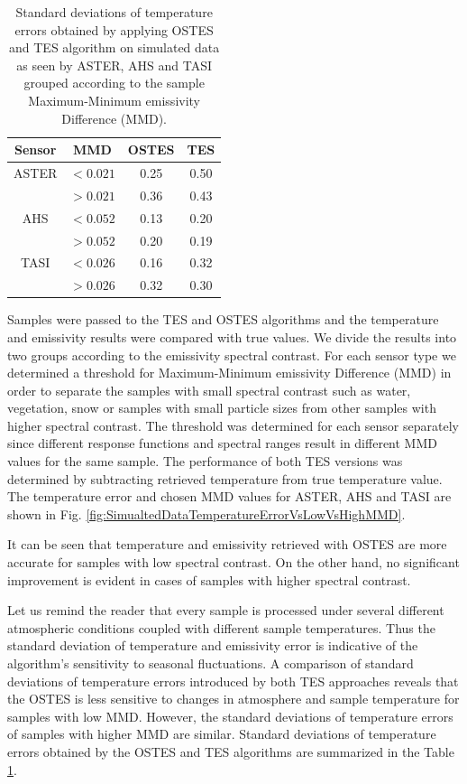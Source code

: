 \begin{table}[!t]
\renewcommand{\arraystretch}{1.5}
\caption{Standard deviations of temperature errors obtained by applying OSTES and TES algorithm on simulated data as seen by ASTER, AHS and TASI grouped according to the sample Maximum-Minimum emissivity Difference (MMD). }
\label{table:StandardDeviations}
\centering
\begin{tabular}{cccc}
\hline
Sensor & MMD & OSTES & TES \\ \hline
ASTER 	& $< 0.021$ & 0.25 & 0.50 \\
 		& $> 0.021$ & 0.36 & 0.43 \\ \hline
AHS 		& $< 0.052$ & 0.13 & 0.20 \\
 		& $> 0.052$ & 0.20 & 0.19 \\ \hline
TASI 	& $< 0.026$ & 0.16 & 0.32 \\
 		& $> 0.026$ & 0.32 & 0.30 \\
\hline
\end{tabular}
\end{table}

Samples were passed to the TES and OSTES algorithms and the temperature and emissivity results were compared with true values. We divide the results into two groups according to the emissivity spectral contrast. For each sensor type we determined a threshold for Maximum-Minimum emissivity Difference (MMD) in order to separate the samples with small spectral contrast such as water, vegetation, snow or samples with small particle sizes from other samples with higher spectral contrast. The threshold was determined for each sensor separately since different response functions and spectral ranges result in different MMD values for the same sample. The performance of both TES versions was determined by subtracting retrieved temperature from true temperature value. The temperature error and chosen MMD values for ASTER, AHS and TASI are shown in Fig. \ref{fig:SimualtedDataTemperatureErrorVsLowVsHighMMD}.

It can be seen that temperature and emissivity retrieved with OSTES are more accurate for samples with low spectral contrast. On the other hand, no significant improvement is evident in cases of samples with higher spectral contrast. 

Let us remind the reader that every sample is processed under several different atmospheric conditions coupled with different sample temperatures. Thus the standard deviation of temperature and emissivity error is indicative of the algorithm’s sensitivity to seasonal fluctuations. A comparison of standard deviations of temperature errors introduced by both TES approaches reveals that the OSTES is less sensitive to changes in atmosphere and sample temperature for samples with low MMD. However, the standard deviations of temperature errors of samples with higher MMD are similar. Standard deviations of temperature errors obtained by the OSTES and TES algorithms are summarized in the Table \ref{table:StandardDeviations}.

